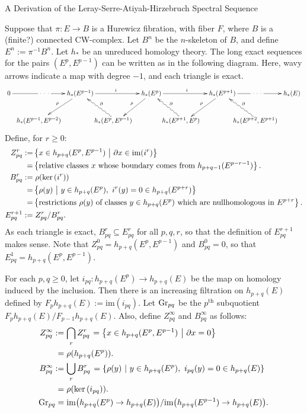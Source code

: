 \documentclass[11pt]{article}
\newcommand{\im}{\mbox{im}}
\newcommand{\Gr}{\textup{Gr}}
\renewcommand{\ker}{\textup{ker}\,}
\theoremstyle{plain}
\theoremstyle{definition}
\renewcommand{\to}{\longrightarrow}
\newcommand{\myheading}[1]%
{{\noindent\Large #1}

}
\begin{document}
\myheading{A Derivation of the Leray-Serre-Atiyah-Hirzebruch Spectral Sequence}
Suppose that $\pi:E\to B$ is a Hurewicz fibration, with fiber $F$, where $B$ is a (finite?) connected CW-complex. Let $B^n$ be the $n$-skeleton of $B$, and define $E^n:=\pi^{-1}B^n$. Let $h_*$ be an unreduced homology theory. The long exact sequences for the pairs $(E^p,E^{p-1})$ can be written as in the following diagram. Here, wavy arrows indicate a map with degree $-1$, and each triangle is exact.
\[\xymatrix{
0\ar[rr]|{\ \cdot\ \cdot\ \cdot\ }&&h_*(E^{p-1})\ar[rr]^i\ar[ld]_\rho&&h_*(E^{p})\ar[rr]^i \ar[ld]_\rho&&h_*(E^{p+1})\ar[ld]_\rho
\ar[rr]|{\ \cdot\ \cdot\ \cdot\ }&&h_*(E)\\
&\ \ \ \ \shrt{h_*(E^{p-1},E^{p-2})}\phantom{{5\choose3}}&&
\shrt{h_*(E^{p},E^{p-1})}\phantom{{5\choose3}}\ar@{~>}[lu]_\partial&&
\shrt{h_*(E^{p+1},E^{p})}\phantom{{5\choose3}}\ar@{~>}[lu]_\partial&&
\shrt{h_*(E^{p+2},E^{p+1})}\phantom{{5\choose3}}\ar@{~>}[lu]_\partial
}\]
Define, for $r\geq0$:
\begin{alignat*}{2}
Z_{pq}^r:=&\left\{x\in h_{p+q}(E^p,E^{p-1})\ \middle|\ \partial x\in\im(i^{r})\right\}\\
=&\left\{\text{relative classes $x$ whose boundary comes from $h_{p+q-1}(E^{p-r-1})$}\right\}.\\
B_{pq}^r:=&\left.\rho(\ker(i^r))\right.\\
=&\left\{\rho(y)\ \middle|\ y\in h_{p+q}(E^p),\ i^r(y)=0\in h_{p+q}(E^{p+r})\right\}\\
=&\left\{\text{restrictions $\rho(y)$ of classes $y\in h_{p+q}(E^p)$ which are nullhomologous in $E^{p+r}$}\right\}.\\
E_{pq}^{r+1}:=&\left.Z_{pq}^r/B_{pq}^r.\right.
\end{alignat*}
As each triangle is exact, $B_{pq}^r\subseteq E_{pq}^r$ for all $p,q,r$, so that the definition of $E_{pq}^{r+1}$ makes sense.
Note that $Z_{pq}^0=h_{p+q}(E^p,E^{p-1})$ and $B_{pq}^0=0$, so that $E_{pq}^1=h_{p+q}(E^p,E^{p-1})$.

For each $p,q\geq0$, let $i_{pq}:h_{p+q}(E^p)\to h_{p+q}(E)$ be the map on homology induced by the inclusion. Then there is an increasing filtration on $h_{p+q}(E)$ defined by $F_{p}h_{p+q}(E):=\im(i_{pq})$. Let $\Gr_{pq}$ be the $p^\text{th}$ subquotient $F_{p}h_{p+q}(E)/F_{p-1}h_{p+q}(E)$. Also, define $Z^\infty_{pq}$ and $B^\infty_{pq}$ as follows:
\begin{alignat*}{2}
Z_{pq}^\infty:=&\left.\bigcap_r Z_{pq}^r\right.=\left\{x\in h_{p+q}(E^p,E^{p-1})\ \middle|\ \partial x=0\right\}\\
=&\left.\rho(h_{p+q}(E^p)).\right.\\
B_{pq}^\infty:=&\left.\bigcup_r B_{pq}^r\right.=\left\{\rho(y)\ \middle|\ y\in h_{p+q}(E^p),\ i_{pq}(y)=0\in h_{p+q}(E)\right\}\\
=&\left.\rho(\ker (i_{pq})).\right.\\
\Gr_{pq}=&\left.\im\bigl(h_{p+q}(E^p)\rightarrow h_{p+q}(E)\bigr)/\im\bigl(h_{p+q}(E^{p-1})\rightarrow h_{p+q}(E)\bigr).\right.
\end{alignat*}
\end{document}
